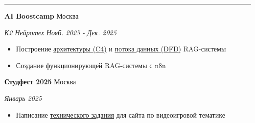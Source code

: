 \documentclass[14pt, a4paper, oneside]{extarticle}
\begin{document}
\vspace{-0.8\intextsep}
\hrule


\begin{flushleft}
	\vspace{-0.8\intextsep}
	\quad
	\textbf{AI Boostcamp}
	\hfill
	Москва
\end{flushleft}

\begin{flushleft}
	\vspace{-1\intextsep}
	\quad
	\textit{К2 Нейротех}
	\hfill
	\textit{\small Нояб. 2025 - Дек. 2025}
\end{flushleft}


\begin{itemize}
	\vspace{-2\intextsep}
	\item Построение \href{https://github.com/Crazy5202/job_application_form/tree/main/portfolio/K2/RAG_C4.pdf}{архитектуры (C4)} и \href{https://github.com/Crazy5202/job_application_form/tree/main/portfolio/K2/RAG_DFD.pdf}{потока данных (DFD)} RAG-системы
	\vspace{-0.8\intextsep}
    \item Создание функционирующей RAG-системы с n8n
\end{itemize}


\begin{flushleft}
	\vspace{-0.8\intextsep}
	\quad
	\textbf{Студфест 2025}
	\hfill
	Москва
\end{flushleft}

\begin{flushleft}
	\vspace{-1\intextsep}
	\quad
	\hfill
	\textit{\small Январь 2025}
\end{flushleft}


\begin{itemize}
	\vspace{-2\intextsep}
	\item Написание \href{https://github.com/Crazy5202/job_application_form/tree/main/portfolio/OnlyGames%5B%D0%A2ex_%D0%97%D0%B0%D0%B4%D0%B0%D0%BD%D0%B8%D0%B5%5D.pdf}{технического задания} для сайта по видеоигровой тематике
\end{itemize}

\end{document}
